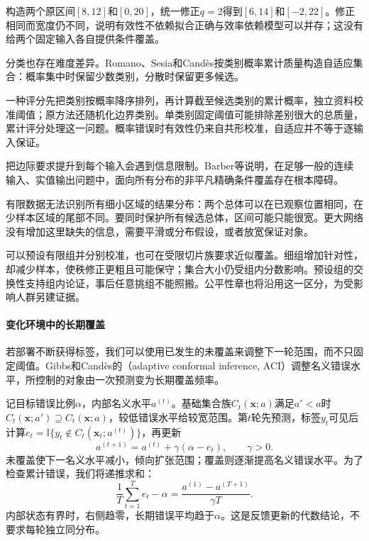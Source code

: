 构造两个原区间$[8,12]$和$[0,20]$，统一修正$q=2$得到$[6,14]$和$[-2,22]$。修正相同而宽度仍不同，说明有效性不依赖拟合正确与效率依赖模型可以并存；这没有给两个固定输入各自提供条件覆盖。

分类也存在难度差异。Romano、Sesia和Candès按类别概率累计质量构造自适应集合：概率集中时保留少数类别，分散时保留更多候选。

一种评分先把类别按概率降序排列，再计算截至候选类别的累计概率，独立资料校准阈值；原方法还随机化边界类别。单类别固定阈值可能排除差别很大的总质量，累计评分处理这一问题。概率错误时有效性仍来自共形校准，自适应并不等于逐输入保证。

把边际要求提升到每个输入会遇到信息限制。Barber等说明，在足够一般的连续输入、实值输出问题中，面向所有分布的非平凡精确条件覆盖存在根本障碍。

有限数据无法识别所有细小区域的结果分布：两个总体可以在已观察位置相同，在少样本区域的尾部不同。要同时保护所有候选总体，区间可能只能很宽。更大网络没有增加这里缺失的信息，需要平滑或分布假设，或者放宽保证对象。

可以预设有限组并分别校准，也可在受限切片族要求近似覆盖。细组增加针对性，却减少样本，使秩修正更粗且可能保守；集合大小仍受组内分数影响。预设组的交换性支持组内论证，事后任意挑组不能照搬。公平性章也将沿用这一区分，为受影响人群另建证据。

\paragraph{变化环境中的长期覆盖}

若部署不断获得标签，我们可以使用已发生的未覆盖来调整下一轮范围，而不只固定阈值。Gibbs和Candès的（adaptive conformal inference, ACI）调整名义错误水平，所控制的对象由一次预测变为长期覆盖频率。

记目标错误比例$\alpha$，内部名义水平$a^{(t)}$。基础集合族$C_t(\bm{x};a)$满足$a'<a$时$C_t(\bm{x};a')\supseteq C_t(\bm{x};a)$，较低错误水平给较宽范围。第$t$轮先预测，标签$y_t$可见后计算$e_t=\mathbb I\{y_t\notin C_t(\bm{x}_t;a^{(t)})\}$，再更新
\begin{equation}
 a^{(t+1)}=a^{(t)}+\gamma(\alpha-e_t),
 \qquad \gamma>0.
 \label{eq:reliability-aci}
\end{equation}
未覆盖使下一名义水平减小，倾向扩张范围；覆盖则逐渐提高名义错误水平。为了检查累计错误，我们将递推求和：
\[
 \frac1T\sum_{t=1}^{T}e_t-\alpha
 =\frac{a^{(1)}-a^{(T+1)}}{\gamma T}.
\]
内部状态有界时，右侧趋零，长期错误平均趋于$\alpha$。这是反馈更新的代数结论，不要求每轮独立同分布。


